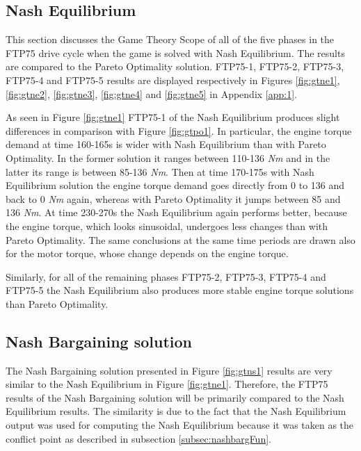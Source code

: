 \subsection{Nash Equilibrium}
This section discusses the Game Theory Scope of all of the five phases in the FTP75 drive cycle when the game is solved with Nash Equilibrium. The results are compared to the Pareto Optimality solution. FTP75-1, FTP75-2, FTP75-3, FTP75-4 and FTP75-5 results are displayed respectively in Figures \ref{fig:gtne1}, \ref{fig:gtne2}, \ref{fig:gtne3}, \ref{fig:gtne4} and \ref{fig:gtne5} in Appendix \ref{app:1}.

As seen in Figure \ref{fig:gtne1} FTP75-1 of the Nash Equilibrium produces slight differences in comparison with Figure \ref{fig:gtpo1}. In particular, the engine torque demand at time 160-165s is wider with Nash Equilibrium than with Pareto Optimality. In the former solution it ranges between 110-136 \textit{Nm} and in the latter its range is between 85-136 \textit{Nm}. Then at time 170-175s with Nash Equilibrium solution the engine torque demand goes directly from 0 to 136 and back to 0 \textit{Nm} again, whereas with Pareto Optimality it jumps between 85 and 136 \textit{Nm}. At time 230-270s the Nash Equilibrium again performs better, because the engine torque, which looks sinusoidal, undergoes less changes than with Pareto Optimality. The same conclusions at the same time periods are drawn also for the motor torque, whose change depends on the engine torque.

Similarly, for all of the remaining phases FTP75-2, FTP75-3, FTP75-4 and FTP75-5 the Nash Equilibrium also produces more stable engine torque solutions than Pareto Optimality.

\subsection{Nash Bargaining solution}
The Nash Bargaining solution presented in Figure \ref{fig:gtns1} results are very similar to the Nash Equilibrium in Figure \ref{fig:gtne1}. Therefore, the FTP75 results of the Nash Bargaining solution will be primarily compared to the Nash Equilibrium results. The similarity is due to the fact that the Nash Equilibrium output was used for computing the Nash Equilibrium because it was taken as the conflict point as described in subsection \ref{subsec:nashbargFun}.

